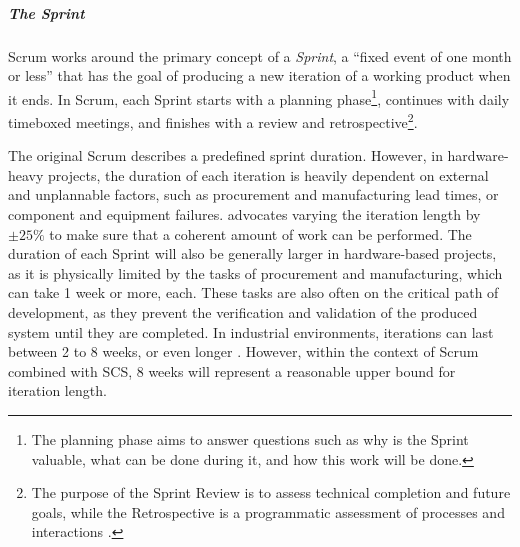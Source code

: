 \documentclass[a4paper,nobib,justified,final]{tufte-book}
\begin{document}
\subparagraph{The Sprint}
Scrum works around the primary concept of a \emph{Sprint}, a  ``fixed event of one month or less'' that has the goal of producing a new iteration of a working product when it ends. In Scrum, each Sprint starts with a planning phase\footnote{The planning phase aims to answer questions such as why is the Sprint valuable, what can be done during it, and how this work will be done.},  continues with daily timeboxed meetings, and finishes with a review and retrospective\footnote{The purpose of the Sprint Review is to assess technical completion and future goals, while the Retrospective is a programmatic assessment of processes and interactions \cite{schwaverDefinitiveGuideScrum2020}.}.

The original Scrum describes a predefined sprint duration. However, in hardware-heavy projects, the duration of each iteration is heavily dependent on external and unplannable factors, such as procurement and manufacturing lead times, or component and equipment failures. \citeauthor{douglassAgileSystemsEngineering2015} \autocite{douglassAgileSystemsEngineering2015} advocates varying the iteration length by \( \pm 25\% \) to make sure that a coherent amount of work can be performed. The duration of each Sprint will also be generally larger in hardware-based projects, as it is physically limited by the tasks of procurement and manufacturing, which can take 1 week or more, each. These tasks are also often on the critical path of development, as they prevent the verification and validation of the produced system until they are completed.
In industrial environments, iterations can last between 2 to 8 weeks, or even longer \autocite{cooperAgileDevelopmentManufacturing2023}. However, within the context of Scrum combined with \acs{SCS}, 8 weeks will represent a reasonable upper bound for iteration length.
\end{document}
